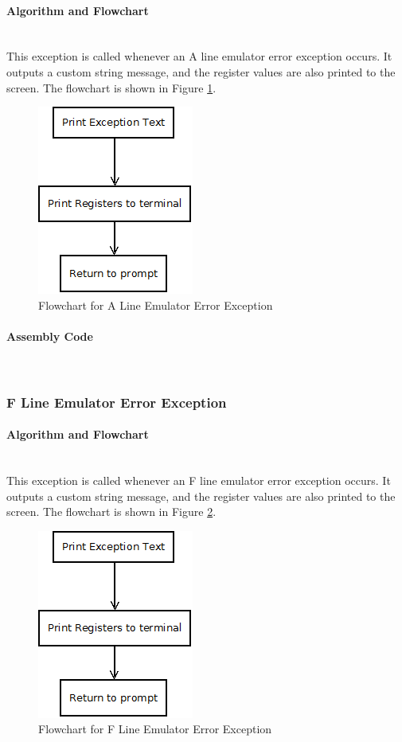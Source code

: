 \documentclass[12pt]{article}
\begin{document}
			\paragraph{Algorithm and Flowchart}~\\
			This exception is called whenever an A line emulator error exception occurs. It outputs a custom string message, and the register values are also printed to the screen. The flowchart is shown in Figure \ref{fig:Aline}.
			\begin{figure}[H]
				\centering
				\includegraphics[width=0.3\linewidth]{Exception}
				\caption{Flowchart for A Line Emulator Error Exception}
				\label{fig:Aline}
			\end{figure}
			\paragraph{Assembly Code}~\\	
						
			
			\subsubsection{F Line Emulator Error Exception}
			\paragraph{Algorithm and Flowchart}~\\
			This exception is called whenever an F line emulator error exception occurs. It outputs a custom string message, and the register values are also printed to the screen. The flowchart is shown in Figure \ref{fig:Fline}.
			
			\begin{figure}[H]
				\centering
				\includegraphics[width=0.3\linewidth]{Exception}
				\caption{Flowchart for F Line Emulator Error Exception}
				\label{fig:Fline}
			\end{figure}
\end{document}
